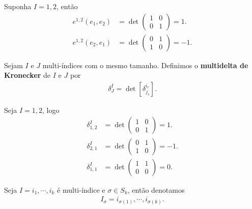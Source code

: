 \begin{example}
  Suponha $I=1,2$, então
  \begin{align*}
    e^{1,2}(e_1,e_2)&=\det \begin{pmatrix}
      1 & 0 \\
      0 & 1
    \end{pmatrix}=1.\\
    e^{1,2}(e_2,e_1)&=\det \begin{pmatrix}
      0 & 1 \\
      1 & 0
    \end{pmatrix}=-1.
  \end{align*}
\end{example}
\begin{definition}
  Sejam $I$ e $J$ multi-índices com o mesmo tamanho. Definimos o \textbf{multidelta de Kronecker} de $I$ e $J$ por
  \begin{align*}
    \delta_{J}^{I}=\det\left[ \delta_{j_s}^{i_r} \right].
  \end{align*}
\end{definition}
\begin{example}
  Seja $I=1,2$, logo
  \begin{align*}
    \delta_{1,2}^{I}&=\det \begin{pmatrix}
      1 & 0 \\
      0 & 1
    \end{pmatrix}=1.\\
    \delta_{2,1}^{I}&=\det \begin{pmatrix}
      0 & 1 \\
      1 & 0
    \end{pmatrix}=-1.\\
    \delta_{1,1}^{I}&=\det \begin{pmatrix}
      1 & 1 \\
      0 & 0
    \end{pmatrix}=0.
  \end{align*}
\end{example}
\begin{notation}
  Seja $I=i_1,\cdots,i_k$ é multi-índice e $\sigma\in S_{k}$, então denotamos
  \begin{align*}
    I_\sigma=i_{\sigma(1)},\cdots,i_{\sigma(k)}.
  \end{align*}
\end{notation}
